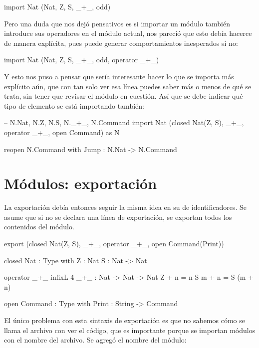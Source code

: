 {\begin{designfr}
\begin{anglercode}
import Nat (Nat, Z, S, _+_, odd)
\end{anglercode}

Pero una duda que nos dejó pensativos es si importar un módulo también introduce sus operadores en el módulo actual, nos pareció que esto debía hacerce de manera explícita, pues puede generar comportamientos inesperados si no:

\begin{anglercode}
import Nat (Nat, Z, S, _+_, odd, operator _+_)
\end{anglercode}

Y esto nos puso a pensar que sería interesante hacer lo que se importa más explícito aún, que con tan solo ver esa línea puedes saber más o menos de qué se trata, sin tener que revisar el módulo en cuestión. Así que se debe indicar qué tipo de elemento se está importando también:

\begin{anglercode}
-- N.Nat, N.Z, N.S, N._+_, N.Command
import Nat (closed Nat(Z, S), _+_, operator _+_, open Command) as N

reopen N.Command with
    Jump : N.Nat -> N.Command
\end{anglercode}
\end{designfr}

\section{Módulos: exportación}

\begin{designfr}
La exportación debía entonces seguir la misma idea en su de identificadores. Se asume que si no se declara una línea de exportación, se exportan todos los contenidos del módulo.

\begin{anglercode}[morekeywords={export}]
export (closed Nat(Z, S), _+_, operator _+_, open Command(Print))

closed Nat : Type with
    Z : Nat
    S : Nat -> Nat

operator _+_ infixL 4
_+_ : Nat -> Nat -> Nat
Z + n = n
S m + n = S (m + n)

open Command : Type with
    Print : String -> Command
\end{anglercode}

El único problema con esta sintaxis de exportación es que no sabemos cómo se llama el archivo con ver el código, que es importante porque se importan módulos con el nombre del archivo. Se agregó el nombre del módulo:


\end{designfr}}
